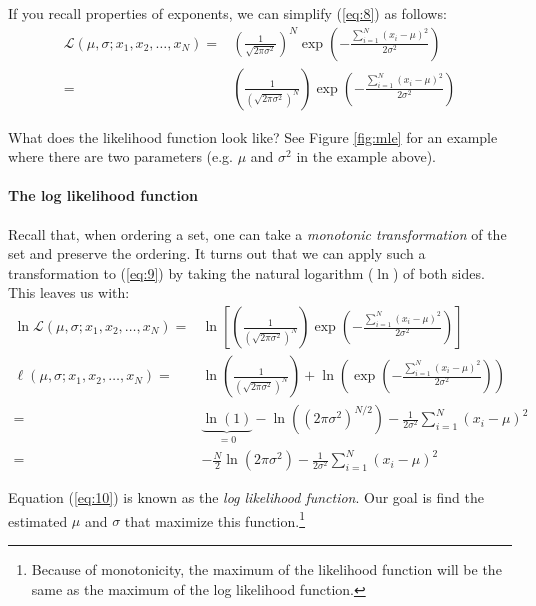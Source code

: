 \documentclass[12pt,english]{article}
\begin{document}
If you recall properties of exponents, we can simplify (\ref{eq:8}) as follows:
\begin{align}
\mathcal{L}\left(\mu,\sigma;x_{1},x_{2},\ldots,x_{N}\right)= & \left(\frac{1}{\sqrt{2\pi\sigma^{2}}}\right)^{N}\exp\left(-\frac{\sum_{i=1}^{N}\left(x_{i}-\mu\right)^{2}}{2\sigma^{2}}\right)\nonumber \\
= & \left(\frac{1}{\left(\sqrt{2\pi\sigma^{2}}\right)^{N}}\right)\exp\left(-\frac{\sum_{i=1}^{N}\left(x_{i}-\mu\right)^{2}}{2\sigma^{2}}\right)\label{eq:9}
\end{align}

What does the likelihood function look like? See Figure \ref{fig:mle} for an example where there are two parameters (e.g. $\mu$ and $\sigma^{2}$ in the example above).

\paragraph{The log likelihood function}

Recall that, when ordering a set, one can take a \emph{monotonic transformation} of the set and preserve the ordering. It turns out that we can apply such a transformation to (\ref{eq:9}) by taking the natural logarithm ($\ln$) of both sides. This leaves us with:
\begin{align}
\ln\mathcal{L}\left(\mu,\sigma;x_{1},x_{2},\ldots,x_{N}\right)= & \ln\left[\left(\frac{1}{\left(\sqrt{2\pi\sigma^{2}}\right)^{N}}\right)\exp\left(-\frac{\sum_{i=1}^{N}\left(x_{i}-\mu\right)^{2}}{2\sigma^{2}}\right)\right]\nonumber \\
\ell\left(\mu,\sigma;x_{1},x_{2},\ldots,x_{N}\right)= & \ln\left(\frac{1}{\left(\sqrt{2\pi\sigma^{2}}\right)^{N}}\right)+\ln\left(\exp\left(-\frac{\sum_{i=1}^{N}\left(x_{i}-\mu\right)^{2}}{2\sigma^{2}}\right)\right)\nonumber \\
= & \underbrace{\ln\left(1\right)}_{=0}-\ln\left(\left(2\pi\sigma^{2}\right)^{N/2}\right)-\frac{1}{2\sigma^{2}}\sum_{i=1}^{N}\left(x_{i}-\mu\right)^{2}\nonumber \\
= & -\frac{N}{2}\ln\left(2\pi\sigma^{2}\right)-\frac{1}{2\sigma^{2}}\sum_{i=1}^{N}\left(x_{i}-\mu\right)^{2}\label{eq:10}
\end{align}

Equation (\ref{eq:10}) is known as the \emph{log likelihood function}. Our goal is find the estimated $\mu$ and $\sigma$ that maximize this function.\footnote{Because of monotonicity, the maximum of the likelihood function will be the same as the maximum of the log likelihood function.}
\end{document}
